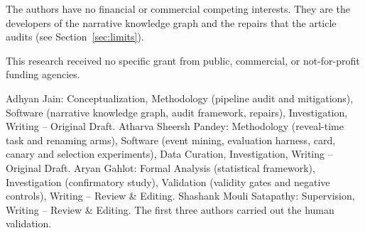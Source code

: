 \documentclass[sn-mathphys]{sn-jnl}%
\theoremstyle{thmstyleone}%
\theoremstyle{thmstyletwo}%
\theoremstyle{thmstylethree}%
\begin{document}
 The authors have no financial or commercial competing interests. They are the developers of the narrative knowledge graph and the repairs that the article audits (see Section~\ref{sec:limits}).

 This research received no specific grant from public, commercial, or not-for-profit funding agencies.

 Adhyan Jain: Conceptualization, Methodology (pipeline audit and mitigations), Software (narrative knowledge graph, audit framework, repairs), Investigation, Writing -- Original Draft. Atharva Sheersh Pandey: Methodology (reveal-time task and renaming arms), Software (event mining, evaluation harness, card, canary and selection experiments), Data Curation, Investigation, Writing -- Original Draft. Aryan Gahlot: Formal Analysis (statistical framework), Investigation (confirmatory study), Validation (validity gates and negative controls), Writing -- Review \& Editing. Shashank Mouli Satapathy: Supervision, Writing -- Review \& Editing. The first three authors carried out the human validation.

\end{document}
